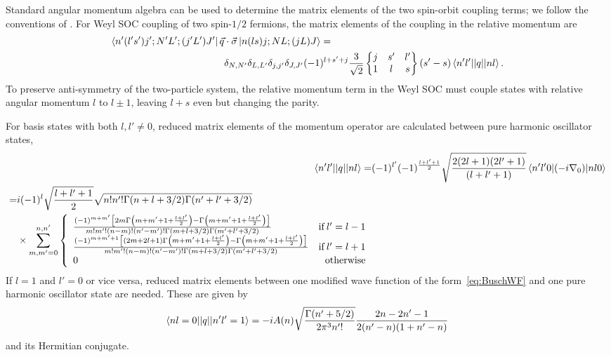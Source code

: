 \documentclass[%
 onecolumn,
 notitlepage,
 amsmath,amssymb,
 aps,
]{revtex4-1}
\newcommand{\sixj}[6]{ \begin{Bmatrix}
  #1 & #2 & #3 \\
  #4 & #5 & #6 
 \end{Bmatrix}}
\begin{document}
Standard angular momentum algebra can be used to determine the matrix elements of the two spin-orbit coupling terms; we follow the conventions of \cite{Edmonds}. For Weyl SOC coupling of two spin-$1/2$ fermions, the matrix elements of the coupling in the relative momentum are
\begin{equation}\label{eq:WeylRel}\begin{split}
\bra{n'(l's')j';N'L';(j'L')J'}\vec{q}&\cdot\vec{\sigma} \ket{n(ls)j;NL;(jL)J} = \\
&\delta_{N,N'}\delta_{L,L'}\delta_{j,j'}\delta_{J,J'}(-1)^{l+s'+j}\frac{3}{\sqrt{2}}\sixj{j}{s'}{l'}{1}{l}{s} (s'-s)\braket{n'l' || q || n l}.
\end{split}
\end{equation}
To preserve anti-symmetry of the two-particle system, the relative momentum term in the Weyl SOC must couple states with relative angular momentum $l$ to $l\pm 1$, leaving $l+s$ even but changing the parity.

For basis states with both $l,l'\neq0$, reduced matrix elements of the momentum operator are calculated between pure harmonic oscillator states,
\begin{align}
\braket{n'l' || q || n l}=&(-1)^{l'}(-1)^{\frac{l+l'+1}{2}}\sqrt{\frac{2(2l+1)(2l'+1)}{(l+l'+1)}}\braket{n'l'0| (-i \nabla_0) | n l 0} \\
\begin{split} =& i(-1)^{l}\sqrt{\frac{l+l'+1}{2}}\sqrt{n!n'!\Gamma(n+l+3/2)\Gamma(n'+l'+3/2)} \\ 
&\times\sum_{m,m'=0}^{n,n'} \left\{
     \begin{array}{lr}
       \frac{(-1)^{m+m'}\left[2m\Gamma\left(m+m'+1+\frac{l+l'}{2}\right)-\Gamma\left(m+m'+1+\frac{l+l'}{2}\right)\right]}{m!m'!(n-m)!(n'-m')!\Gamma(m+l+3/2)\Gamma(m'+l'+3/2)} & \text{if}\: l'=l-1 \\
        \frac{(-1)^{m+m'+1}\left[(2m+2l+1)\Gamma\left(m+m'+1+\frac{l+l'}{2}\right)-\Gamma\left(m+m'+1+\frac{l+l'}{2}\right)\right]}{m!m'!(n-m)!(n'-m')!\Gamma(m+l+3/2)\Gamma(m'+l'+3/2)} & \text{if}\: l'=l+1 \\
       0 & \text{otherwise}
     \end{array}
   \right.
   \end{split}
\end{align}
If $l=1$ and $l'=0$ or vice versa, reduced matrix elements between one modified wave function of the form~\eqref{eq:BuschWF} and one pure harmonic oscillator state are needed. These are given by
\begin{align}
\braket{n l=0 || q || n' l'=1}=-i A(n) \sqrt{\frac{\Gamma(n'+5/2)}{2\pi^3 n'!}}\frac{2n-2n'-1}{2(n'-n)(1+n'-n)}
\end{align}
and its Hermitian conjugate.
\end{document}
